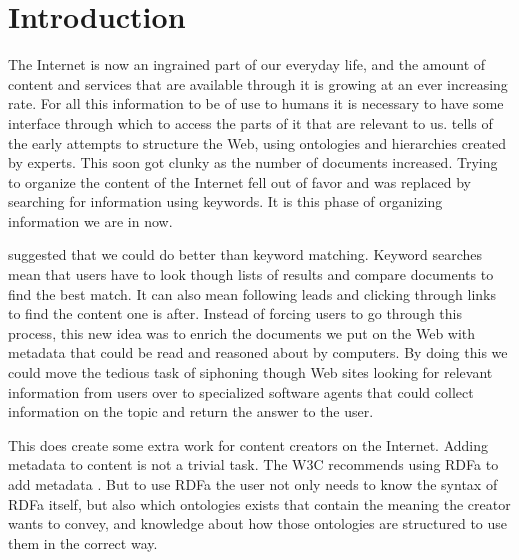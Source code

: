 
\chapter{Introduction} %

\label{Introduction}



The Internet is now an ingrained part of our everyday life,
and the amount of content and services that are available through it is growing at an ever increasing rate.
For all this information to be of use to humans it is necessary to have some interface through which to access the parts of it that are relevant to us.
\citet{Shirky2007} tells of the early attempts to structure the Web,
using ontologies and hierarchies created by experts.
This soon got clunky as the number of documents increased.
Trying to organize the content of the Internet fell out of favor and was replaced by searching for information using keywords.
It is this phase of organizing information we are in now.

\citet{Berners-Lee2001} suggested that we could do better than keyword matching.
Keyword searches mean that users have to look though lists of results and compare documents to find the best match.
It can also mean following leads and clicking through links to find the content one is after.
Instead of forcing users to go through this process,
this new idea was to enrich the documents we put on the Web with metadata that could be read and reasoned about by computers.
By doing this we could move the tedious task of siphoning though Web sites looking for relevant information from users
over to specialized software agents that could collect information on the topic and return the answer to the user.

This does create some extra work for content creators on the Internet.
Adding metadata to content is not a trivial task.
The W3C recommends using RDFa to add metadata \citep{Pemberton:08:RXS}.
But to use RDFa the user not only needs to know the syntax of RDFa itself,
but also which ontologies exists that contain the meaning the creator wants to convey,
and knowledge about how those ontologies are structured to use them in the correct way.


